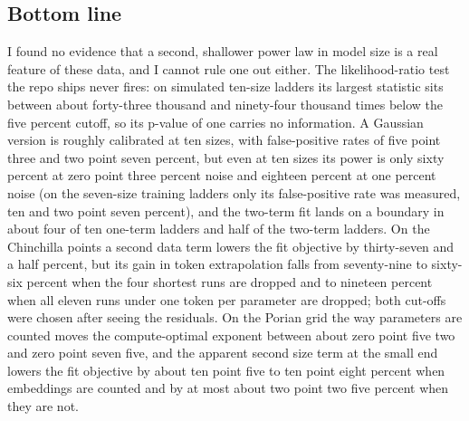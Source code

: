
\subsection*{Bottom line}

I found no evidence that a second, shallower power law in model size is a real feature of these data, and I cannot rule one out either. The likelihood-ratio test the repo ships never fires: on simulated ten-size ladders its largest statistic sits between about forty-three thousand and ninety-four thousand times below the five percent cutoff, so its p-value of one carries no information. A Gaussian version is roughly calibrated at ten sizes, with false-positive rates of five point three and two point seven percent, but even at ten sizes its power is only sixty percent at zero point three percent noise and eighteen percent at one percent noise (on the seven-size training ladders only its false-positive rate was measured, ten and two point seven percent), and the two-term fit lands on a boundary in about four of ten one-term ladders and half of the two-term ladders. On the Chinchilla points a second data term lowers the fit objective by thirty-seven and a half percent, but its gain in token extrapolation falls from seventy-nine to sixty-six percent when the four shortest runs are dropped and to nineteen percent when all eleven runs under one token per parameter are dropped; both cut-offs were chosen after seeing the residuals. On the Porian grid the way parameters are counted moves the compute-optimal exponent between about zero point five two and zero point seven five, and the apparent second size term at the small end lowers the fit objective by about ten point five to ten point eight percent when embeddings are counted and by at most about two point two five percent when they are not.


